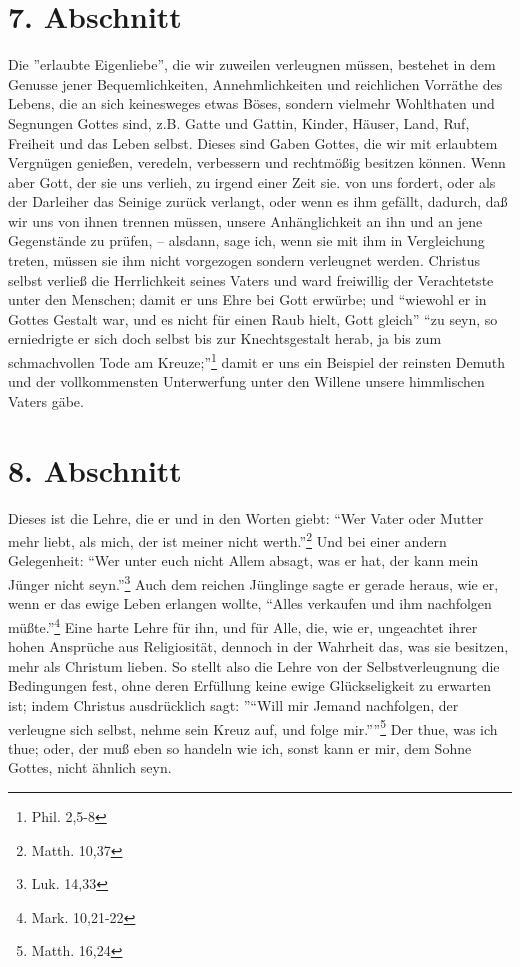 \section{7. Abschnitt}

Die ''erlaubte Eigenliebe'', die wir zuweilen verleugnen müssen, bestehet in dem Genusse jener Bequemlichkeiten, Annehmlichkeiten und reichlichen Vorräthe des Lebens, die an sich keinesweges etwas Böses, sondern vielmehr Wohlthaten und Segnungen Gottes sind, z.B. Gatte und Gattin, Kinder, Häuser, Land, Ruf, Freiheit und das Leben selbst. Dieses sind Gaben Gottes, die wir mit erlaubtem Vergnügen genießen, veredeln, verbessern und rechtmößig besitzen können. Wenn aber Gott, der sie uns verlieh, zu irgend einer Zeit sie. von uns fordert, oder als der Darleiher das Seinige zurück verlangt, oder wenn es ihm gefällt, dadurch, daß wir uns von ihnen trennen müssen, unsere Anhänglichkeit an ihn und an jene Gegenstände zu prüfen, -- alsdann, sage ich, wenn sie mit ihm in Vergleichung treten, müssen sie ihm nicht vorgezogen sondern verleugnet werden. Christus selbst verließ die Herrlichkeit seines Vaters und ward freiwillig der Verachtetste unter den Menschen; damit er uns Ehre bei Gott erwürbe; und "`wiewohl er in Gottes Gestalt war, und es nicht für einen Raub hielt, Gott gleich"' "`zu seyn, so erniedrigte er sich doch selbst bis zur Knechtsgestalt herab, ja bis zum schmachvollen Tode am Kreuze;"'\footnote{Phil. 2,5-8} damit er uns ein Beispiel der reinsten Demuth und der vollkommensten Unterwerfung unter den Willene unsere himmlischen Vaters gäbe.

\section{8. Abschnitt}

Dieses ist die Lehre, die er und in den Worten giebt: "`Wer Vater oder Mutter mehr liebt, als mich, der ist meiner nicht werth."'\footnote{Matth. 10,37} Und bei einer andern Gelegenheit: "`Wer unter euch nicht Allem absagt, was er hat, der kann mein Jünger nicht seyn."'\footnote{Luk. 14,33} Auch dem reichen Jünglinge sagte er gerade heraus, wie er, wenn er das ewige Leben erlangen wollte, "`Alles verkaufen und ihm nachfolgen müßte."'\footnote{Mark. 10,21-22} Eine harte Lehre für ihn, und für Alle, die, wie er, ungeachtet ihrer hohen Ansprüche aus Religiosität, dennoch in der Wahrheit das, was sie besitzen, mehr als Christum lieben. So stellt also die Lehre von der Selbstverleugnung die Bedingungen fest, ohne deren Erfüllung keine ewige Glückseligkeit zu erwarten ist; indem Christus ausdrücklich sagt: ''"`Will mir Jemand nachfolgen, der verleugne sich selbst, nehme sein Kreuz auf, und folge mir."'''\footnote{Matth. 16,24} Der thue, was ich thue; oder, der muß eben so handeln wie ich, sonst kann er mir, dem Sohne Gottes, nicht ähnlich seyn.

